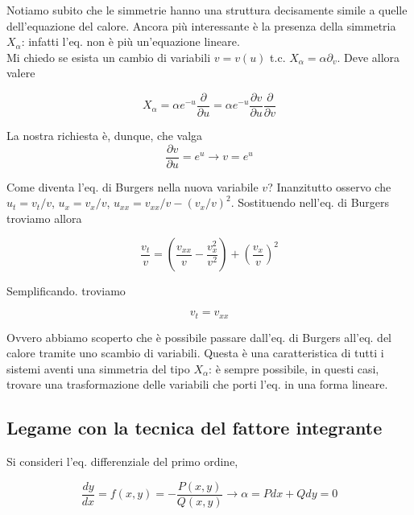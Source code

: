 \documentclass{report}
\begin{document}
Notiamo subito che le simmetrie hanno una struttura decisamente simile a quelle dell'equazione del calore. Ancora più interessante è la presenza della simmetria $X_\alpha$: infatti l'eq. non è più un'equazione lineare. \\

Mi chiedo se esista un cambio di variabili $v = v(u)$ t.c. $X_\alpha = \alpha\partial_v$. Deve allora valere 

\begin{equation}
    X_\alpha = \alpha e^{-u}\frac{\partial}{\partial u} = \alpha e^{-u}\frac{\partial v}{\partial u}\frac{\partial }{\partial v }
\end{equation}

La nostra richiesta è, dunque, che valga 
\begin{equation}
    \frac{\partial v}{\partial u} = e^u \rightarrow v = e^u
\end{equation}

Come diventa l'eq. di Burgers nella nuova variabile $v$? Inanzitutto osservo che $u_t = v_t/v$, $u_x = v_x/v$, $u_{xx} = v_{xx}/v - (v_x/v)^2$. Sostituendo nell'eq. di Burgers troviamo allora 

\begin{equation}
    \frac{v_t}{v} = \left(\frac{v_{xx}}{v} - \frac{v_x^2}{v^2} \right) + \left(\frac{v_x}{v} \right)^2
\end{equation}

Semplificando. troviamo

\begin{equation}
    v_t = v_{xx}
\end{equation}

Ovvero abbiamo scoperto che è possibile passare dall'eq. di Burgers all'eq. del calore tramite uno scambio di variabili. Questa è una caratteristica di tutti i sistemi aventi una simmetria del tipo $X_\alpha$: è sempre possibile, in questi casi, trovare una trasformazione delle variabili che porti l'eq. in una forma lineare. 

\subsection{Legame con la tecnica del fattore integrante}

Si consideri l'eq. differenziale del primo ordine, 

\begin{equation}
    \frac{dy}{dx} = f(x, y) = -\frac{P(x, y)}{Q(x, y)} \rightarrow \alpha = Pdx +Qdy = 0  
\end{equation}
\end{document}
